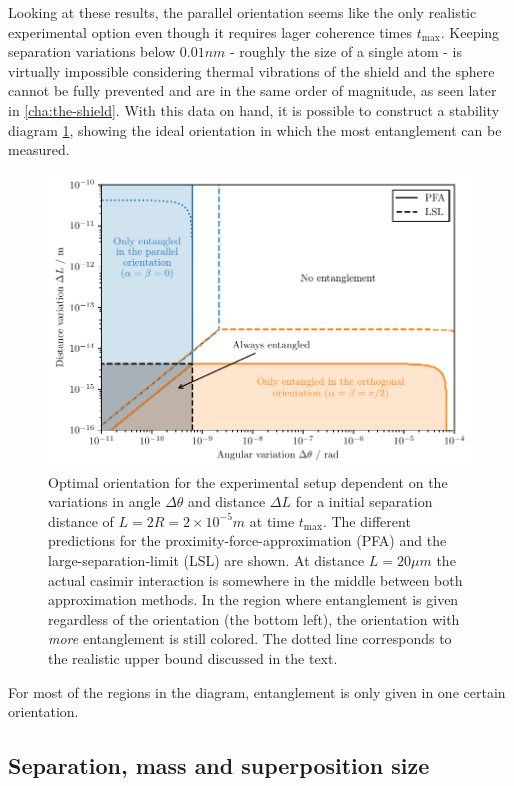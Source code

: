 Looking at these results, the parallel orientation seems like the only realistic experimental option even though it requires lager coherence times $t_\mathrm{max}$.
Keeping separation variations below $0.01\si{nm}$ - roughly the size of a single atom - is virtually impossible considering thermal vibrations of the shield and the sphere cannot be fully prevented and are in the same order of magnitude, as seen later in \cref{cha:the-shield}.
With this data on hand, it is possible to construct a stability diagram \cref{fig:4:optimal-orientation}, showing the ideal orientation in which the most entanglement can be measured.
\begin{figure}[!htbp]
  \centering
  \includegraphics[width=\textwidth]{./../figures/optimize/optimized-orientation-advanced.pdf}
  \caption{Optimal orientation for the experimental setup dependent on the variations in angle $\Delta\theta$ and distance $\Delta L$ for a initial separation distance of $L=2R=2\times 10^{-5}\si{m}$ at time $t_\mathrm{max}$. The different predictions for the proximity-force-approximation (PFA) and the large-separation-limit (LSL) are shown. At distance $L=20\si{\mu m}$ the actual casimir interaction is somewhere in the middle between both approximation methods. In the region where entanglement is given regardless of the orientation (the bottom left), the orientation with \textit{more} entanglement is still colored. The dotted line corresponds to the realistic upper bound discussed in the text.}
  \label{fig:4:optimal-orientation}
\end{figure}
For most of the regions in the diagram, entanglement is only given in one certain orientation.


\subsection{Separation, mass and superposition size}

